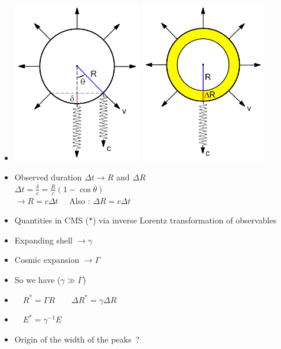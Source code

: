 \begin{itemize}
\item[] \includegraphics[keepaspectratio,height=7cm]{grb-shell1}
        \includegraphics[keepaspectratio,height=7cm]{grb-shell2}
\item Observed duration $\Delta t \rightarrow R$ and $\Delta R$\\[2mm]
      $\displaystyle \Delta t=\frac{\delta}{c}=\frac{R}{c}\left(1-\cos\theta\right)$\\[2mm]
      $\rightarrow R=c\Delta t \quad$ Also : $\Delta R=c\Delta t$
\end{itemize}

\newpage

\vspace*{2.5cm}

\begin{itemize}
\item Quantities in CMS ($\ast$) via inverse Lorentz transformation of observables
\item[] Expanding shell $\rightarrow \gamma$
\item[] Cosmic expansion $\rightarrow \Gamma$
\item So we have ($\gamma \gg \Gamma$)
\item[] $\quad R^{\ast}=\Gamma R \qquad \Delta R^{\ast}=\gamma \Delta R$
\item[] $\quad E^{\ast}=\gamma^{-1} E$
\item {\blue Origin of the width of the peaks~?}
\end{itemize}

